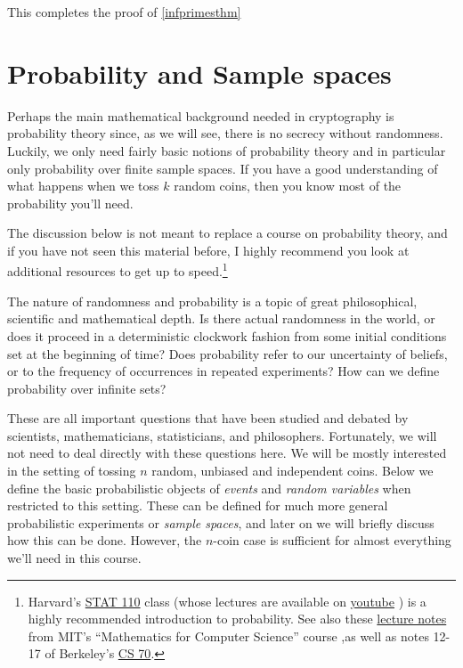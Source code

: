 This completes the proof of \cref{infprimesthm}

\section{Probability and Sample spaces}\label{0-Probability-and-Sample}

Perhaps the main mathematical background needed in cryptography is
probability theory since, as we will see, there is no secrecy without
randomness. Luckily, we only need fairly basic notions of probability
theory and in particular only probability over finite sample spaces. If
you have a good understanding of what happens when we toss \(k\) random
coins, then you know most of the probability you'll need.

The discussion below is not meant to replace a course on probability
theory, and if you have not seen this material before, I highly
recommend you look at additional resources to get up to
speed.\footnote{Harvard's
  \href{http://projects.iq.harvard.edu/stat110/home}{STAT 110} class
  (whose lectures are available on
  \href{http://projects.iq.harvard.edu/stat110/youtube}{youtube} ) is a
  highly recommended introduction to probability. See also these
  \href{http://www.boazbarak.org/cs121/LLM_probability.pdf}{lecture
  notes} from MIT's ``Mathematics for Computer Science'' course ,as well
  as notes 12-17 of Berkeley's \href{https://www.eecs70.org/}{CS 70}.}

The nature of randomness and probability is a topic of great
philosophical, scientific and mathematical depth. Is there actual
randomness in the world, or does it proceed in a deterministic clockwork
fashion from some initial conditions set at the beginning of time? Does
probability refer to our uncertainty of beliefs, or to the frequency of
occurrences in repeated experiments? How can we define probability over
infinite sets?

These are all important questions that have been studied and debated by
scientists, mathematicians, statisticians, and philosophers.
Fortunately, we will not need to deal directly with these questions
here. We will be mostly interested in the setting of tossing \(n\)
random, unbiased and independent coins. Below we define the basic
probabilistic objects of \emph{events} and \emph{random variables} when
restricted to this setting. These can be defined for much more general
probabilistic experiments or \emph{sample spaces}, and later on we will
briefly discuss how this can be done. However, the \(n\)-coin case is
sufficient for almost everything we'll need in this course.

